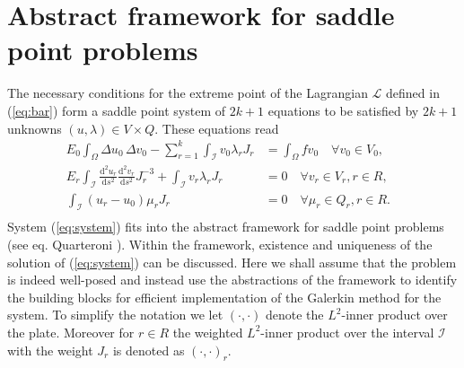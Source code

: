 \documentclass{marine_2015}
\newcommand{\inner}[2]{\ensuremath{\left(#1, #2\right)}}
\newcommand{\rinner}[2]{\ensuremath{\left(#1, #2\right)_r}}
\newcommand{\deriv}[2]{\ensuremath{\frac{\mathrm{d}#1}{\mathrm{d}#2}}}
\begin{document}
\section{Abstract framework for saddle point problems}
\label{sec:abstract}
The necessary conditions for the extreme point of the Lagrangian $\mathcal{L}$
defined in (\ref{eq:bar}) form a saddle point system of $2k+1$ equations to be 
satisfied by $2k+1$ unknowns $\left(u, \lambda\right)\in V\times Q$. These equations read
\begin{equation}
  \label{eq:system}
  \begin{aligned}
    E_0\displaystyle\int_{\Omega}\Delta u_0\,\Delta v_0-
    \sum_{r=1}^k\int_{\mathcal{I}}v_0\lambda_r J_r &=\displaystyle\int_{\Omega}f
    v_0\quad\forall v_0\in V_0,& \\
    E_r\displaystyle\int_{\mathcal{I}}
    \deriv{^2u_r}{s^2}\deriv{^2v_r}{s^2}J_r^{-3} +
  \int_{\mathcal{I}} v_r \lambda_r J_r &= 0\quad\forall v_r\in V_r, r\in R,&\\
  \int_{\mathcal{I}}\left(u_r-u_0\right)\mu_r J_r &= 0\quad\forall \mu_r\in Q_r,
    r\in R.&\\
  \end{aligned}
\end{equation}
System (\ref{eq:system}) fits into the abstract framework for saddle point
problems (see eq. Quarteroni \cite{quarteroni}). Within the framework, existence
and uniqueness of the solution of (\ref{eq:system}) can be discussed. Here we
shall assume that the problem is indeed well-posed and instead use the abstractions
of the framework to identify the building blocks for efficient implementation
of the Galerkin method for the system. To simplify the notation we
let $\inner{\cdot}{\cdot}$ denote the $L^2$-inner product over the plate.
Moreover for $r\in R$ the weighted $L^2$-inner product over the
interval $\mathcal{I}$ with the weight $J_r$ is denoted as $\rinner{\cdot}{\cdot}$.
\end{document}
